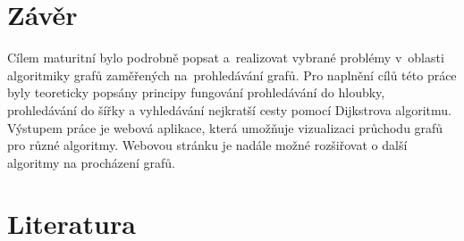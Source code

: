 \documentclass[12pt, titlepage, a4paper]{article}
\begin{document}
\clearpage
\section{Závěr}
Cílem maturitní bylo podrobně popsat a~realizovat vybrané problémy v~oblasti 
algoritmiky grafů zaměřených na~prohledávání grafů.
Pro naplnění cílů této práce byly teoreticky popsány principy fungování prohledávání do hloubky, 
prohledávání do šířky a vyhledávání nejkratší cesty pomocí Dijkstrova algoritmu. 
\\
Výstupem práce je webová aplikace, která umožňuje vizualizaci průchodu grafů pro různé algoritmy.
Webovou stránku je nadále možné rozšiřovat o další algoritmy na procházení grafů.
\clearpage
\listoffigures
\clearpage
\section{Literatura}
\end{document}
